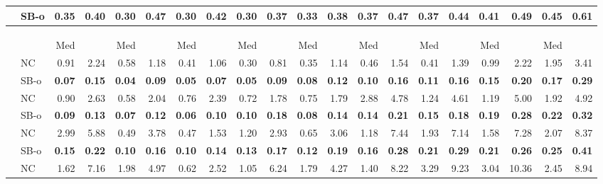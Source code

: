 \documentclass[runningheads,a4paper]{llncs}
\begin{document}
\begin{sidewaystable}
\begin{tabularx}{1\textwidth}{p{0.8cm}p{0.8cm}|RR|RR|RR|RR|RR|RR|RR|RR|RR}
 & \centering SB-o  & \textbf{0.35} & \textbf{0.40} & \textbf{0.30} & \textbf{0.47} & \textbf{0.30} & \textbf{0.42} & \textbf{0.30} & \textbf{0.37} & \textbf{0.33} & \textbf{0.38} & \textbf{0.37} & \textbf{0.47} & \textbf{0.37} & \textbf{0.44} & \textbf{0.41} & \textbf{0.49} & \textbf{0.45} & \textbf{0.61} \\
\hline
\\
  & &  \\
  & &  &  &  &  &  &  &  &  &  \\
\centering  & & Med &  & Med &  & Med &  & Med &  & Med &  & Med &  & Med &  & Med &  & Med &  \\
\hline
\centering{} & \centering NC & 0.91 & 2.24 & 0.58 & 1.18 & 0.41 & 1.06 & 0.30 & 0.81 & 0.35 & 1.14 & 0.46 & 1.54 & 0.41 & 1.39 & 0.99 & 2.22 & 1.95 & 3.41 \\
 & \centering SB-o  & \textbf{0.07} & \textbf{0.15} & \textbf{0.04} & \textbf{0.09} & \textbf{0.05} & \textbf{0.07} & \textbf{0.05} & \textbf{0.09} & \textbf{0.08} & \textbf{0.12} & \textbf{0.10} & \textbf{0.16} & \textbf{0.11} & \textbf{0.16} & \textbf{0.15} & \textbf{0.20} & \textbf{0.17} & \textbf{0.29} \\
\hline
\centering{} & \centering NC & 0.90 & 2.63 & 0.58 & 2.04 & 0.76 & 2.39 & 0.72 & 1.78 & 0.75 & 1.79 & 2.88 & 4.78 & 1.24 & 4.61 & 1.19 & 5.00 & 1.92 & 4.92 \\
 & \centering SB-o  & \textbf{0.09} & \textbf{0.13} & \textbf{0.07} & \textbf{0.12} & \textbf{0.06} & \textbf{0.10} & \textbf{0.10} & \textbf{0.18} & \textbf{0.08} & \textbf{0.14} & \textbf{0.14} & \textbf{0.21} & \textbf{0.15} & \textbf{0.18} & \textbf{0.19} & \textbf{0.28} & \textbf{0.22} & \textbf{0.32} \\
\hline
\centering{} & \centering NC & 2.99 & 5.88 & 0.49 & 3.78 & 0.47 & 1.53 & 1.20 & 2.93 & 0.65 & 3.06 & 1.18 & 7.44 & 1.93 & 7.14 & 1.58 & 7.28 & 2.07 & 8.37 \\
 & \centering SB-o  & \textbf{0.15} & \textbf{0.22} & \textbf{0.10} & \textbf{0.16} & \textbf{0.10} & \textbf{0.14} & \textbf{0.13} & \textbf{0.17} & \textbf{0.12} & \textbf{0.19} & \textbf{0.16} & \textbf{0.28} & \textbf{0.21} & \textbf{0.29} & \textbf{0.21} & \textbf{0.26} & \textbf{0.25} & \textbf{0.41} \\
\hline
\centering{} & \centering NC & 1.62 & 7.16 & 1.98 & 4.97 & 0.62 & 2.52 & 1.05 & 6.24 & 1.79 & 4.27 & 1.40 & 8.22 & 3.29 & 9.23 & 3.04 & 10.36 & 2.45 & 8.94 \\

\end{tabularx}
\end{sidewaystable}
\end{document}
